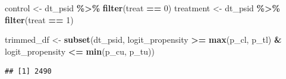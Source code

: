 \documentclass[
]{article}
\newenvironment{Shaded}{\begin{snugshade}}{\end{snugshade}}
\newcommand{\DecValTok}[1]{\textcolor[rgb]{0.00,0.00,0.81}{#1}}
\newcommand{\FunctionTok}[1]{\textcolor[rgb]{0.13,0.29,0.53}{\textbf{#1}}}
\newcommand{\NormalTok}[1]{#1}
\newcommand{\OtherTok}[1]{\textcolor[rgb]{0.56,0.35,0.01}{#1}}
\newcommand{\SpecialCharTok}[1]{\textcolor[rgb]{0.81,0.36,0.00}{\textbf{#1}}}
\begin{document}
\begin{Shaded}
\begin{Highlighting}[]
\NormalTok{control }\OtherTok{\textless{}{-}}\NormalTok{ dt\_psid }\SpecialCharTok{\%\textgreater{}\%} \FunctionTok{filter}\NormalTok{(treat }\SpecialCharTok{==} \DecValTok{0}\NormalTok{)}
\NormalTok{treatment }\OtherTok{\textless{}{-}}\NormalTok{ dt\_psid }\SpecialCharTok{\%\textgreater{}\%} \FunctionTok{filter}\NormalTok{(treat }\SpecialCharTok{==} \DecValTok{1}\NormalTok{)}
\end{Highlighting}
\end{Shaded}

\begin{Shaded}
\end{Shaded}

\begin{Shaded}
\begin{Highlighting}[]
\NormalTok{trimmed\_df }\OtherTok{\textless{}{-}} \FunctionTok{subset}\NormalTok{(dt\_psid, logit\_propensity }\SpecialCharTok{\textgreater{}=} 
              \FunctionTok{max}\NormalTok{(p\_cl, p\_tl) }\SpecialCharTok{\&}\NormalTok{ logit\_propensity }\SpecialCharTok{\textless{}=} \FunctionTok{min}\NormalTok{(p\_cu, p\_tu))}
\end{Highlighting}
\end{Shaded}

\begin{Shaded}
\end{Shaded}

\begin{verbatim}
## [1] 2490
\end{verbatim}

\begin{Shaded}
\end{Shaded}
\end{document}
